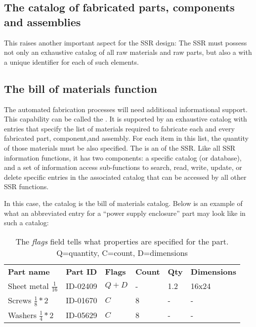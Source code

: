 \subsection[The catalog of fabricated parts, components and assemblies]{The catalog of fabricated parts, components and assemblies}

This raises another
important aspect for the SSR design: The SSR must possess not only an
exhaustive catalog of all raw materials and raw parts, but also a
with a unique identifier for each  of such elements. 

\subsection[The bill of materials function]{The bill of materials function}

The automated fabrication
processes will need additional informational support. 
This capability can be called the . It is supported by
an exhaustive catalog with entries that specify  the list of materials required to fabricate
each and every 
fabricated part, component,and assembly.
For each item in this
list, the quantity of those materials must be also
specified. The  is an  of
the SSR. Like all SSR information functions, it has two components: a specific catalog (or database),
 and a set of information access sub-functions to search, read, write, update, or delete specific entries in 
the associated catalog that can be accessed by all other SSR functions.  

In this case, the catalog
is the bill of materials catalog.  
Below is an example of what an abbreviated
entry for a “power supply enclosure” part may look like in such a catalog:

\begin{table}[h]
\caption{Example Entries in the Bill of Materials Catalog for the ``Power Supply Enclosure'' part}
\begin{center}
\begin{tabular}{| l l l l l l |}
\hline
\textbf{Part name} &
\textbf{Part ID} &
\textbf{Flags} &
\textbf{Count} &
\textbf{Qty} &
\textbf{Dimensions}\\
Sheet metal $\frac{1}{16}$ &
ID-02409
 &
$Q + D$
 &
- &
1.2
 &
16x24
\\
Screws $\frac{1}{8}*2$ &
ID-01670
 &
$C$
 &
8 &
-
 &
-
\\
Washers $\frac{1}{4}*2$ &
ID-05629
 &
$C$
 &
8 &
-
 &
-
\\\hline
\end{tabular}
\end{center}
\caption*{The \textit{flags} field tells what properties are specified for the part.  Q=quantity, C=count, D=dimensions}
\end{table}

